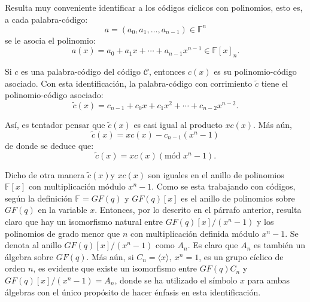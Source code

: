 Resulta muy conveniente identificar a los códigos cíclicos con polinomios, esto es, a cada palabra-código:
\[ a = (a_0, a_1, \dots , a_{n-1}) \in \mathds{F}^n \] se le asocia el polinomio: \[ a(x) = a_0 + a_1x+ \cdots + a_{n-1}x^{n-1} \in \mathds{F}[x]_n .\] 

Si $c$ es una palabra-código del código $\mathcal{C}$, entonces $c(x)$ es su polinomio-código asociado. Con esta identificación, la palabra-código con corrimiento $\tilde{c}$ tiene el polinomio-código asociado: \[ \tilde{c}(x) = c_{n-1} + c_0x + c_1x^2 + \cdots + c_{n-2}x^{n-2}. \] 

Así, es tentador pensar que $\tilde{c}(x) $ es casi igual al producto $xc(x)$. Más aún, 
\[ \tilde{c}(x) = xc(x) - c_{n-1}(x^n -1)  \] de donde se deduce que: \[ \tilde{c}(x) = xc(x) (\mbox{mód } x^n-1) .\] 

Dicho de otra manera $\tilde{c}(x)$y $xc(x)$ son iguales en el anillo de polinomios $\mathds{F}[x]$ con multiplicación módulo $x^n-1$. Como se esta trabajando con códigos, según la definición $\mathds{F} = GF(q) $ y $GF(q)[x]$ es el anillo de polinomios sobre $GF(q)$ en la variable $x$. Entonces, por lo descrito en el párrafo anterior, resulta claro que hay un isomorfismo natural entre $GF(q)[x]/(x^n-1)$ y los polinomios de grado menor que $n$ con multiplicación definida módulo $x^n-1$. Se denota al anillo $GF(q)[x]/(x^n-1)$ como $A_n$. Es claro que $A_n$ es también un álgebra sobre $GF(q)$. Más aún, si $C_n = \langle x \rangle,\ x^n =1$, es un grupo cíclico de orden $n$, es evidente que existe un isomorfismo entre $GF(q)C_n$ y $GF(q)[x]/(x^n-1) = A_n$, donde se ha utilizado el símbolo $x$ para ambas álgebras con el único propósito de hacer énfasis en esta identificación.

